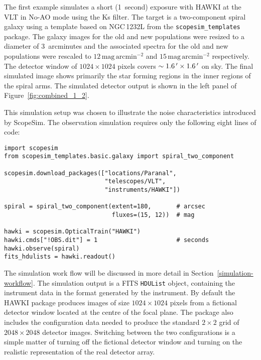 The first example simulates a short (1~second) exposure with HAWKI
\cite{hawki} at the VLT in No-AO mode using the Ks filter.  The target
is a two-component spiral galaxy using a template based on NGC\,1232L
from the \lstinline{scopesim_templates} package.  The galaxy images
for the old and new populations were resized to a diameter of
3~arcminutes and the associated spectra for the old and new
populations \cite{brown2014} were rescaled to
$12\,\mathrm{mag\,arcmin^{-2}}$ and $15\,\mathrm{mag\,arcmin^{-2}}$
respectively.  The detector window of $1024 \times 1024$ pixels covers
$\sim 1.6\hbox{$\,^\prime$}\times1.6\hbox{$\,^\prime$}$ on sky.  The final simulated image shows
primarily the star forming regions in the inner regions of the spiral
arms.  The simulated detector output is shown in the left panel of
Figure~\ref{fig:combined_1_2}.

This simulation setup was chosen to illustrate the noise
characteristics introduced by ScopeSim.  The observation simulation
requires only the following eight lines of code:

\begin{lstlisting}[frame=single]
import scopesim
from scopesim_templates.basic.galaxy import spiral_two_component

scopesim.download_packages(["locations/Paranal",
                            "telescopes/VLT",
                            "instruments/HAWKI"])

spiral = spiral_two_component(extent=180,       # arcsec
                              fluxes=(15, 12))  # mag

hawki = scopesim.OpticalTrain("HAWKI")
hawki.cmds["!OBS.dit"] = 1                      # seconds
hawki.observe(spiral)
fits_hdulists = hawki.readout()
\end{lstlisting}

The simulation work flow will be discussed in more detail in
Section~\ref{simulation-workflow}.  The simulation output is a FITS
\lstinline{HDUList} object, containing the instrument data in the
format generated by the instrument.  By default the HAWKI package
produces images of size $1024\times 1024$ pixels from a fictional
detector window located at the centre of the focal plane.  The package
also includes the configuration data needed to produce the standard
$2\times2$ grid of $2048\times 2048$ detector images.  Switching
between the two configurations is a simple matter of turning off the
fictional detector window and turning on the realistic representation
of the real detector array.


